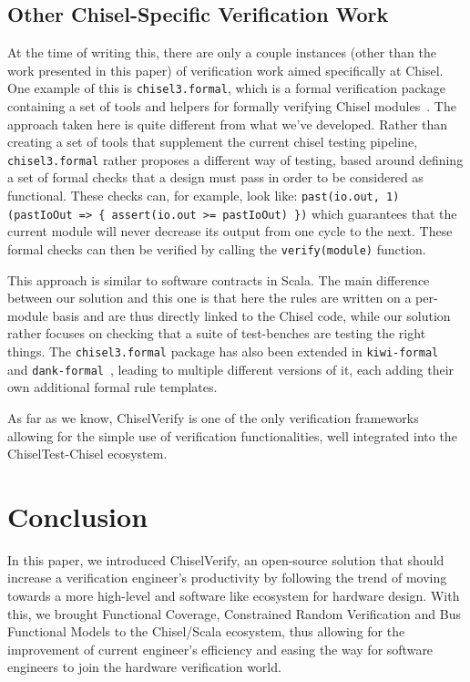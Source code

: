 \documentclass[conference]{IEEEtran}
\begin{document}
\subsection{Other Chisel-Specific Verification Work}
At the time of writing this, there are only a couple instances (other than the work presented in this paper) of verification work aimed specifically at Chisel. One example of this is \texttt{chisel3.formal}, which is a formal verification package containing a set of tools and helpers for formally verifying Chisel modules~\cite{chisel:formal}. The approach taken here is quite different from what we've developed. Rather than creating a set of tools that supplement the current chisel testing pipeline, \texttt{chisel3.formal} rather proposes a different way of testing, based around defining a set of formal checks that a design must pass in order to be considered as functional. These checks can, for example, look like: \texttt{past(io.out, 1) (pastIoOut => \{ assert(io.out >= pastIoOut) \})} which guarantees that the current module will never decrease its output from one cycle to the next. These formal checks can then be verified by calling the \texttt{verify(module)} function. 

This approach is similar to software contracts in Scala. The main difference between our solution and this one is that here the rules are written on a per-module basis and are thus directly linked to the Chisel code, while our solution rather focuses on checking that a suite of test-benches are testing the right things. The \texttt{chisel3.formal} package has also been extended in \texttt{kiwi-formal}~\cite{chisel:kiwi-formal} and \texttt{dank-formal}~\cite{chisel:dank-formal}, leading to multiple different versions of it, each adding their own additional formal rule templates. 

As far as we know, ChiselVerify is one of the only verification frameworks allowing for the simple use of verification functionalities, well integrated into the ChiselTest-Chisel ecosystem.

\section{Conclusion}
In this paper, we introduced ChiselVerify, an open-source solution that should increase a verification engineer's productivity by following the trend of moving towards a more high-level and software like ecosystem for hardware design. With this, we brought Functional Coverage, Constrained Random Verification and Bus Functional Models to the Chisel/Scala ecosystem, thus allowing for the improvement of current engineer's efficiency and easing the way for software engineers to join the hardware verification world.
\end{document}
